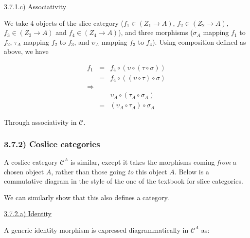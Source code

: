 \documentclass[12pt, letterpaper, twoside]{report}
\begin{document}
3.7.1.c) Associativity

We take 4 objects of the slice category ($f_1 \in (Z_1 \to A)$, $f_2 \in (Z_2 \to A)$, $f_3 \in (Z_3 \to A)$ and  $f_4 \in (Z_4 \to A)$), and three morphisms ($\sigma_A$ mapping $f_1$ to $f_2$, $\tau_A$ mapping $f_2$ to $f_3$, and $\upsilon_A$ mapping $f_3$ to $f_4$). Using composition defined as above, we have

$$
\begin{aligned}
f_1 &=& f_4 \circ ( \upsilon \circ (\tau  \circ \sigma)) \\
    &=& f_4 \circ ((\upsilon \circ  \tau) \circ \sigma ) \\
\Rightarrow && \\
& &  \upsilon_A \circ (\tau_A  \circ \sigma_A) \\
&=& (\upsilon_A \circ  \tau_A) \circ \sigma_A
\end{aligned}
$$

Through associativity in $\mathcal{C}$.


\subsubsection*{3.7.2) Coslice categories}

A coslice category $\mathcal{C}^A$ is similar, except it takes the morphisms coming \textit{from} a chosen object $A$, rather than those going \textit{to} this object $A$. Below is a commutative diagram in the style of the one of the textbook for slice categories.


We can similarly show that this also defines a category.

\vspace{5mm}
\underline{3.7.2.a) Identity}

A generic identity morphism is expressed diagrammatically in $\mathcal{C}^A$ as:

\end{document}

